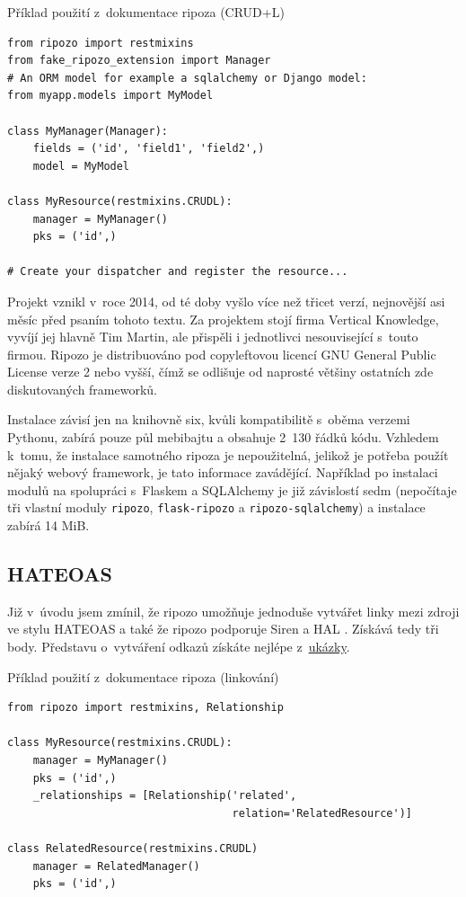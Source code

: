 \begin{listing}[htbp]
\caption{{\label{code:ripozocrudl}Příklad použití z~dokumentace ripoza (CRUD+L) \autocite{ripozo}}}
\begin{verbatim}
from ripozo import restmixins
from fake_ripozo_extension import Manager
# An ORM model for example a sqlalchemy or Django model:
from myapp.models import MyModel

class MyManager(Manager):
    fields = ('id', 'field1', 'field2',)
    model = MyModel

class MyResource(restmixins.CRUDL):
    manager = MyManager()
    pks = ('id',)

# Create your dispatcher and register the resource...
\end{verbatim}
\end{listing}

Projekt vznikl v~roce 2014, od té doby vyšlo více než třicet verzí, nejnovější asi měsíc před psaním tohoto textu. Za projektem stojí firma Vertical Knowledge, vyvíjí jej hlavně Tim Martin, ale přispěli i jednotlivci nesouvisející s~touto firmou. Ripozo je distribuováno pod copyleftovou licencí GNU General Public License verze 2 \autocite{GPLv2} nebo vyšší, čímž se odlišuje od naprosté většiny ostatních zde diskutovaných frameworků.

Instalace závisí jen na knihovně six, kvůli kompatibilitě s~oběma verzemi Pythonu, zabírá pouze půl mebibajtu a obsahuje 2~130 řádků kódu. Vzhledem k~tomu, že instalace samotného ripoza je nepoužitelná, jelikož je potřeba použít nějaký webový framework, je tato informace zavádějící. Například po instalaci modulů na spolupráci s~Flaskem a SQLAlchemy je již závislostí sedm (nepočítaje tři vlastní moduly \verb!ripozo!, \verb!flask-ripozo! a \verb!ripozo-sqlalchemy!) a instalace zabírá 14 MiB.

\subsection{HATEOAS}\label{hateoas}

Již v~úvodu jsem zmínil, že ripozo umožňuje jednoduše vytvářet linky mezi zdroji ve stylu HATEOAS a také že ripozo podporuje Siren \autocite{siren} a HAL \autocite{hal}. Získává tedy tři body. Představu o~vytváření odkazů získáte nejlépe z~\protect\hyperlink{code:ripozolink}{ukázky}.

\begin{listing}[htbp]
\caption{{\label{code:ripozolink}Příklad použití z~dokumentace ripoza (linkování) \autocite{ripozo}}}
\begin{verbatim}
from ripozo import restmixins, Relationship

class MyResource(restmixins.CRUDL):
    manager = MyManager()
    pks = ('id',)
    _relationships = [Relationship('related',
                                   relation='RelatedResource')]

class RelatedResource(restmixins.CRUDL)
    manager = RelatedManager()
    pks = ('id',)
\end{verbatim}
\end{listing}


